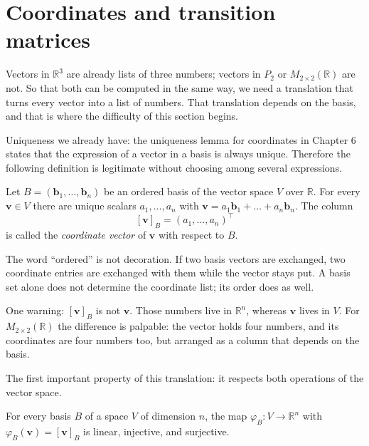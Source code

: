 \section{Coordinates and transition matrices}

Vectors in $\mathbb{R}^{3}$ are already lists of three numbers; vectors in $P_{2}$ or
$M_{2\times2}(\mathbb{R})$ are not. So that both can be computed in the same way, we
need a translation that turns every vector into a list of numbers. That translation depends
on the basis, and that is where the difficulty of this section begins.

Uniqueness we already have: the uniqueness lemma for coordinates in Chapter 6 states that the
expression of a vector in a basis is always unique. Therefore the following definition is
legitimate without choosing among several expressions.


\begin{definisi}
Let $B=(\mathbf{b}_{1},\dots,\mathbf{b}_{n})$ be an ordered basis of the vector space
$V$
over $\mathbb{R}$. For every $\mathbf{v}\in V$ there are unique scalars $a_{1},\dots,a_{n}$
with $\mathbf{v}=a_{1}\mathbf{b}_{1}+\dots+a_{n}\mathbf{b}_{n}$. The column
\[
  [\mathbf{v}]_{B}=(a_{1},\dots,a_{n})^{\top}
\]
is called the \emph{coordinate vector} of $\mathbf{v}$ with respect to $B$.
\end{definisi}

The word ``ordered'' is not decoration. If two basis vectors are exchanged, two coordinate
entries are exchanged with them while the vector stays put. A basis set alone does not
determine the coordinate list;
its order does as well.

One warning: $[\mathbf{v}]_{B}$ is not $\mathbf{v}$. Those numbers live in
$\mathbb{R}^{n}$, whereas $\mathbf{v}$ lives in $V$. For $M_{2\times2}(\mathbb{R})$
the difference is palpable: the vector holds four numbers, and its coordinates are four
numbers too, but arranged as a column that depends on the basis.

The first important property of this translation: it respects both operations of the vector
space.

\begin{proposisi}
For every basis $B$ of a space $V$ of dimension $n$, the map
$\varphi_{B}\colon V\to\mathbb{R}^{n}$ with $\varphi_{B}(\mathbf{v})=[\mathbf{v}]_{B}$
is linear, injective, and surjective.
\end{proposisi}

